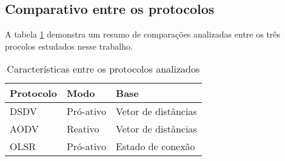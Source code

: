 \subsection{Comparativo entre os protocolos} 
A tabela \ref{tabCompProt} demonstra um resumo de compara\c{c}\~oes analizadas entre os tr\^es procolos estudados nesse trabalho.

\begin{table}[H]
	\centering
	\caption{Caracter\'isticas entre os protocolos analizados}
	\begin{tabular}{ | l | l | l | }
		\hline
		Protocolo & Modo & Base \\ \hline
		DSDV & Pr\'o-ativo & Vetor de dist\^ancias \\ \hline
		AODV & Reativo & Vetor de dist\^ancias \\ \hline
		OLSR & Pr\'o-ativo & Estado de conex\~ao \\ \hline
	\end{tabular}
	\label{tabCompProt}
\end{table}